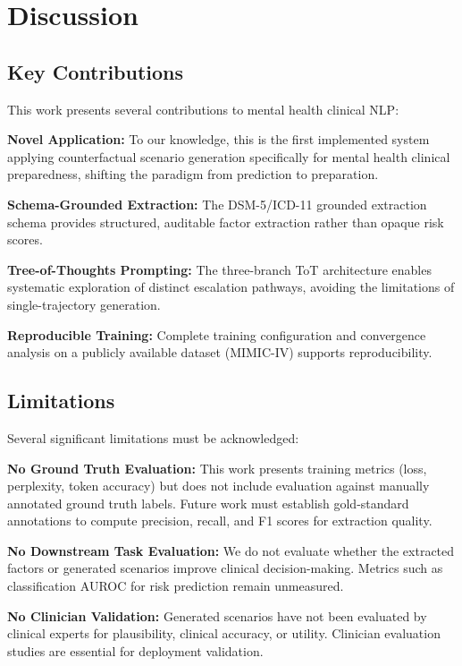 \documentclass[conference]{IEEEtran}
\begin{document}
\section{Discussion}

\subsection{Key Contributions}

This work presents several contributions to mental health clinical NLP:

\textbf{Novel Application:} To our knowledge, this is the first implemented system applying counterfactual scenario generation specifically for mental health clinical preparedness, shifting the paradigm from prediction to preparation.

\textbf{Schema-Grounded Extraction:} The DSM-5/ICD-11 grounded extraction schema provides structured, auditable factor extraction rather than opaque risk scores.

\textbf{Tree-of-Thoughts Prompting:} The three-branch ToT architecture enables systematic exploration of distinct escalation pathways, avoiding the limitations of single-trajectory generation.

\textbf{Reproducible Training:} Complete training configuration and convergence analysis on a publicly available dataset (MIMIC-IV) supports reproducibility.

\subsection{Limitations}

Several significant limitations must be acknowledged:

\textbf{No Ground Truth Evaluation:} This work presents training metrics (loss, perplexity, token accuracy) but does not include evaluation against manually annotated ground truth labels. Future work must establish gold-standard annotations to compute precision, recall, and F1 scores for extraction quality.

\textbf{No Downstream Task Evaluation:} We do not evaluate whether the extracted factors or generated scenarios improve clinical decision-making. Metrics such as classification AUROC for risk prediction remain unmeasured.

\textbf{No Clinician Validation:} Generated scenarios have not been evaluated by clinical experts for plausibility, clinical accuracy, or utility. Clinician evaluation studies are essential for deployment validation.
\end{document}
